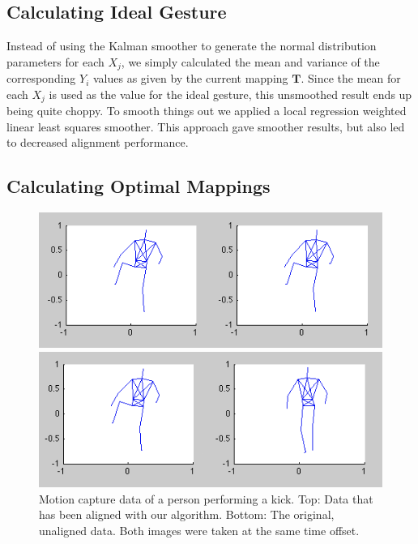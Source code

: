 \documentclass{article}
\begin{document}
\subsection{Calculating Ideal Gesture}

Instead of using the Kalman smoother to generate the normal distribution parameters
for each $X_j$, we simply calculated the mean and variance of the corresponding
$Y_i$ values as given by the current mapping $\mathbf{T}$. Since the mean for each
$X_j$ is used as the value for the ideal gesture, this unsmoothed result ends up being
quite choppy. To smooth things out we applied a local regression weighted linear least squares smoother. This approach gave
smoother results, but also led to decreased alignment performance.

\subsection{Calculating Optimal Mappings}


\begin{figure}
\begin{centering}

\begin{centering}
\includegraphics[width=\columnwidth]{figures/kick_aligned.png}	
\end{centering}
\begin{centering}
\includegraphics[width=\columnwidth]{figures/kick_unaligned.png}	
\end{centering}

\vspace{-0.2in}

\caption{Motion capture data of a person performing a kick. Top: Data that has
been aligned with our algorithm. Bottom: The original, unaligned data. Both
images were taken at the same time offset. \label{figure:kick}}

\end{centering}
\end{figure}
\end{document}
